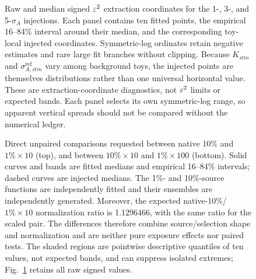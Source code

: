 {\begin{figure}[p]
\centering
{}
\caption{Raw and median signed $\varepsilon^2$ extraction coordinates for the 1-, 3-, and
5-$\sigma_A$ injections.  Each panel contains ten fitted points, the empirical
16--84\% interval around their median, and the corresponding toy-local injected
coordinates.  Symmetric-log ordinates retain negative estimates and rare large
fit branches without clipping.  Because $K_{stm}$ and
$\sigma^{\mathrm{ref}}_{A,stm}$ vary among background toys, the injected points are
themselves distributions rather than one universal horizontal value.  These are
extraction-coordinate diagnostics, not $\varepsilon^2$ limits or expected bands.
Each panel selects its own symmetric-log range, so apparent vertical spreads
should not be compared without the numerical ledger.}
\label{fig:v4p5-eps2-distributions}
\end{figure}

\begin{figure}[p]
\centering
{}
\caption{Direct unpaired comparisons requested between native 10\% and
$1\%\times10$ (top), and between $10\%\times10$ and $1\%\times100$ (bottom).
Solid curves and bands are fitted medians and empirical 16--84\% intervals; dashed
curves are injected medians.  The 1\%- and 10\%-source functions are independently
fitted and their ensembles are independently generated.  Moreover, the expected
native-10\%/$1\%\times10$ normalization ratio is 1.1296466, with the same ratio for
the scaled pair.  The differences therefore combine source/selection shape and
normalization and are neither pure exposure effects nor paired tests.  The shaded
regions are pointwise descriptive quantiles of ten values, not expected bands, and
can suppress isolated extremes; Fig.~\ref{fig:v4p5-eps2-distributions} retains all
raw signed values.}
\label{fig:v4p5-direct-eps2-comparisons}
\end{figure}

}
